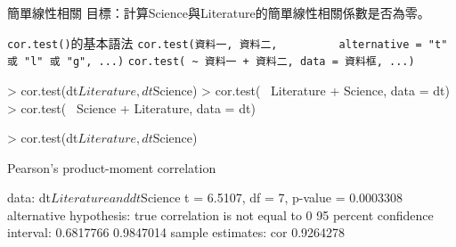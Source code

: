 \documentclass[14pt, aspectratio=43]{beamer}
\begin{document}
\begin{frame}{簡單線性相關}
目標：計算Science與Literature的簡單線性相關係數是否為零。
\begin{block}{\texttt{cor.test()}的基本語法}
\verb+cor.test(資料一, 資料二,+
\verb+         alternative = "t" 或 "l" 或 "g", ...)+
\verb#cor.test( ~ 資料一 + 資料二, data = 資料框, ...)#
\end{block}
\begin{RC}
> cor.test(dt$Literature, dt$Science)
> cor.test(~ Literature + Science, data = dt)
> cor.test(~ Science + Literature, data = dt)
\end{RC}

\framebreak

\begin{RC}
> cor.test(dt$Literature, dt$Science)
\end{RC}
\begin{R}
        Pearson's product-moment correlation

data:  dt$Literature and dt$Science
t = 6.5107, df = 7, p-value = 0.0003308
alternative hypothesis: true correlation is not equal to 0
95 percent confidence interval:
 0.6817766 0.9847014
sample estimates:
      cor 
0.9264278
\end{R}
\end{frame}
\end{document}

